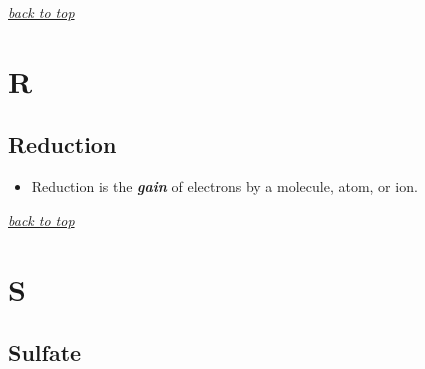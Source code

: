 \documentclass[]{book}
\providecommand{\tightlist}{%
  \setlength{\itemsep}{0pt}\setlength{\parskip}{0pt}}
\theoremstyle{definition}
\theoremstyle{definition}
\theoremstyle{definition}
\theoremstyle{remark}
\begin{document}
\emph{\protect\hyperlink{top}{back to top}}

\section{R}\label{r}

\subsection{Reduction}\label{reduction}

\begin{itemize}
\tightlist
\item
  Reduction is the \emph{\textbf{gain}} of electrons by a molecule,
  atom, or ion.
\end{itemize}

\emph{\protect\hyperlink{top}{back to top}}

\section{S}\label{s}

\subsection{Sulfate}\label{sulfate}
\end{document}
